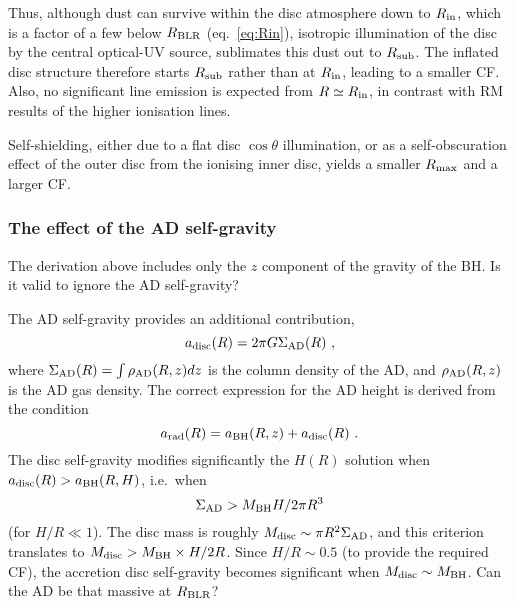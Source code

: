 \documentclass[a4paper,fleqn,usenatbib]{mnras}
\begin{document}
Thus, although dust can survive within the disc atmosphere down to $R_{\rm in}$, which is a factor of a few below 
$R_{\rm BLR}$ (eq.~\ref{eq:Rin}), isotropic illumination of the disc by the central optical-UV source, 
sublimates this dust out to $R_{\rm sub}$. The inflated disc structure therefore starts $R_{\rm sub}$ 
rather than at $R_{\rm in}$, leading to a smaller CF. Also, no significant line emission is expected from 
$R\simeq R_{\rm in}$, in contrast with RM results of the higher ionisation lines.

Self-shielding, either due to a flat disc $\cos\theta$ illumination, or as a self-obscuration 
effect of the outer disc from the ionising inner disc, yields
a smaller $R_{\rm max}$ and a larger CF. 
	

	
\subsubsection{The effect of the AD self-gravity}\label{sec:ADself}

The derivation above includes only the $z$ component of the gravity of the BH. 
Is it valid to ignore the AD self-gravity?

The AD self-gravity provides an additional contribution, 
\begin{equation}
 a_{\rm disc}(R) = 2\pi G \Sigma_{\rm AD}(R)\ , \label{eq:f_disc}
\end{equation}
where $\Sigma_{\rm AD}(R)=\int \rho_{\rm AD}(R,z)dz$ is the column density of the AD,
and $\rho_{\rm AD}(R,z)$ is the AD gas density. The correct expression for the AD height is
derived from the condition 
\begin{equation}
 a_{\rm rad}(R) = a_{\rm BH}(R,z)+a_{\rm disc}(R)\ . \label{eq:f_grav}
\end{equation}
 The disc self-gravity modifies significantly the $H(R)$ solution when $a_{\rm disc}(R)>a_{\rm BH}(R,H)$, i.e.\
when 
\begin{equation}
\Sigma_{\rm AD}>M_{\rm BH}H/2\pi R^3
\label{eq:Mdlimit}
\end{equation}
(for $H/R\ll 1$). The disc mass is roughly
$M_{\rm disc}\sim \pi R^2 \Sigma_{\rm AD}$, and this criterion translates to $M_{\rm disc}> M_{\rm BH}\times H/2R$. 
Since $H/R\sim 0.5$ (to provide the required CF),
the accretion disc self-gravity becomes significant when $M_{\rm disc}\sim M_{\rm BH}$.
Can the AD be that massive at $R_{\rm BLR}$?
\end{document}
